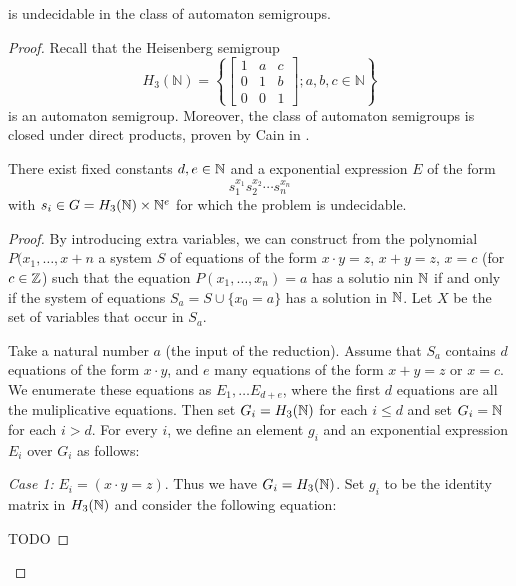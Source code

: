 \documentclass[11pt]{article}
\begin{document}
\begin{theorem}
   is undecidable in the class of automaton semigroups.
\end{theorem}
\begin{proof}

Recall that the Heisenberg semigroup
\[
  H_3(\mathbb{N}) = \left\{
      \begin{bmatrix}
        1 & a & c \\
        0 & 1 & b \\
        0 & 0 & 1
      \end{bmatrix}; a, b, c \in \mathbb{N}
    \right\}
\]
is an automaton semigroup. Moreover, the class of automaton semigroups
is closed under direct products, proven by Cain in
\cite{Cain09:auto_sf}.

\begin{proposition}
  There exist fixed constants $d,e \in \mathbb{N}$ and a exponential
  expression $E$ of the form
  \[s_1^{x_1} s_2^{x_2}\cdots s_n^{x_n} \] with
  $s_i \in G = H_3(\mathbb{N}) \times \mathbb{N}^e$ for which the 
  problem is undecidable.
\end{proposition}

\begin{proof}
  By introducing extra variables, we can construct from the polynomial
  $P(x_1, \ldots, x+n$ a system $S$ of equations of the form
  $x\cdot y = z$, $x+y = z$, $x = c$ (for $c \in \mathbb{Z}$) such that the
  equation $P(x_1,\ldots, x_n) = a$ has a solutio nin $\mathbb{N}$ if and only
  if the system of equations $S_a = S \cup \{x_0 = a\}$ has a solution
  in $\mathbb{N}$. Let $X$ be the set of variables that occur in $S_a$.

  Take a natural number $a$ (the input of the reduction). Assume that
  $S_a$ contains $d$ equations of the form $x\cdot y$, and $e$ many
  equations of the form $x+y = z$ or $x = c$. We enumerate these
  equations as $E_1, \ldots E_{d+e}$, where the first $d$ equations
  are all the muliplicative equations. Then set $G_i = H_3(\mathbb{N})$ for
  each $i \leq d$ and set $G_i = \mathbb{N}$ for each $i > d$. For every $i$,
  we define an element $g_i$ and an exponential expression $E_i$ over
  $G_i$ as follows:

  \textit{Case 1:} $E_i = (x \cdot y = z)$. Thus we have
  $G_i = H_3(\mathbb{N})$. Set $g_i$ to be the identity matrix in $H_3(\mathbb{N})$
  and consider the following equation:

  TODO


\end{proof}
\end{proof}
\end{document}
